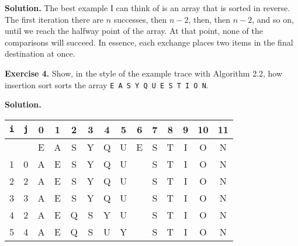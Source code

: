\documentclass[12pt, a4paper]{article}
\newenvironment{ex}[2][Exercise]
{\par\medskip\noindent \textbf{#1 #2.}}
{\medskip}
\newenvironment{sol}[1][Solution]
{\par\medskip\noindent \textbf{#1.} }
{\medskip}
\begin{document}
	\begin{sol}
		The best example I can think of is an array that is sorted in reverse.
		The first iteration there are $n$ successes, then $n-2$, then, then $n-2$,
		and so on, until we reach the halfway point of the array. At that point,
		none of the comparisons will succeed. In essence, each exchange places two items
		in the final destination at once.
	\end{sol}
	\begin{ex}{4}
		Show, in the style of the example trace with Algorithm 2.2, how insertion sort sorts the
		array \texttt{E A S Y Q U E S T I O N}.
	\end{ex}
	\begin{sol}
		\begin{center}
			\begin{tabular}{cc|cccccccccccc}
				\texttt{i} & \texttt{j} & 0 & 1 & 2 & 3 & 4 & 5 & 6 & 7 & 8 & 9 & 10 & 11 \\
				\hline
				{} & {} & E & A & S & Y & Q & U & E & S & T & I & O & N \\
				
				1 & 0 & {\color{red} A} & {\color{black}E} & {\color{gray}S} & {\color{gray}Y}
				& {\color{gray}Q} & {\color{gray}U} & {\color{gray}{E}} & {\color{gray}S} & {\color{gray}T}
				& {\color{gray}I} & {\color{gray}O} & {\color{gray}N} \\
				
				2 & 2 & {\color{gray} A} & {\color{gray}E} & {\color{red}S} & {\color{gray}Y}
				& {\color{gray}Q} & {\color{gray}U} & {\color{gray}{E}} & {\color{gray}S} & {\color{gray}T}
				& {\color{gray}I} & {\color{gray}O} & {\color{gray}N} \\
				
				3 & 3 & {\color{gray} A} & {\color{gray}E} & {\color{gray}S} & {\color{red}Y}
				& {\color{gray}Q} & {\color{gray}U} & {\color{gray}{E}} & {\color{gray}S} & {\color{gray}T}
				& {\color{gray}I} & {\color{gray}O} & {\color{gray}N} \\
				
				4 & 2 & {\color{gray} A} & {\color{gray}E} & {\color{red}Q} & {\color{black}S}
				& {\color{black}Y} & {\color{gray}U} & {\color{gray}{E}} & {\color{gray}S} & {\color{gray}T}
				& {\color{gray}I} & {\color{gray}O} & {\color{gray}N} \\
				
				5 &4 & {\color{gray} A} & {\color{gray}E} & {\color{gray}Q} & {\color{gray}S}
				& {\color{red}U} & {\color{black}Y} & {\color{gray}{E}} & {\color{gray}S} & {\color{gray}T}
				& {\color{gray}I} & {\color{gray}O} & {\color{gray}N} \\
				

\end{tabular}
\end{center}
\end{sol}
\end{document}
